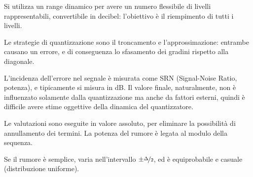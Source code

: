 Si utilizza un range dinamico per avere un numero flessibile di livelli rappresentabili, convertibile in decibel: l'obiettivo è il riempimento di tutti i livelli.

Le strategie di quantizzazione sono il troncamento e l'approssimazione: entrambe causano un errore, e di conseguenza lo sfasamento dei gradini rispetto alla diagonale. 

L'incidenza dell'errore nel segnale è misurata come SRN (Signal-Noise Ratio, potenza), e tipicamente si misura in dB. Il valore finale, naturalmente, non è influenzato solamente dalla quantizzazione ma anche da fattori esterni, quindi è difficile avere stime oggettive della dinamica del quantizzatore.

Le valutazioni sono eseguite in valore assoluto, per eliminare la possibilità di annullamento dei termini. La potenza del rumore è legata al modulo della sequenza. 

Se il rumore è semplice, varia nell'intervallo $\pm \nicefrac{\Delta}{2}$, ed è equiprobabile e casuale (distribuzione uniforme). 

